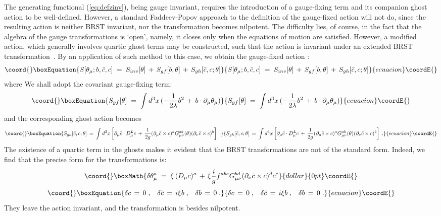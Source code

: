 \documentclass[a4paper,12pt]{article}
\begin{document}
The generating functional (\ref{eq:defzinv}), being gauge invariant,
requires the introduction of a gauge-fixing term and its companion
ghost action to be well-defined. However, a standard Faddeev-Popov
approach to the definition of the gauge-fixed action will not do,
since the resulting action is neither BRST invariant, nor the
transformation becomes nilpotent.  The difficulty lies, of course, in
the fact that the algebra of the gauge transformations is `open',
namely, it closes only when the equations of motion are satisfied.
However, a modified action, which generally involves quartic ghost
terms may be constructed, such that the action is invariant under an
extended BRST transformation~\cite{deWit:1978cd,teit}.  By an application
of such method to this case, we obtain the gauge-fixed action \coordHE{}:
\begin{equation}\coord{}\boxEquation{\label{eq:defsfx}
S[\theta_\mu;b,{\bar c}, c] \;=\; S_{inv}[\theta] \,+\,
S_{gf}[b,\theta]\,+\, S_{gh}[{\bar c},c;\theta] 
}{S[\theta_\mu;b,{\bar c}, c] \;=\; S_{inv}[\theta] \,+\,
S_{gf}[b,\theta]\,+\, S_{gh}[{\bar c},c;\theta] 
}{ecuacion}\coordE{}\end{equation}
where 
We shall adopt the covariant gauge-fixing term:
\begin{equation}\coord{}\boxEquation{\label{eq:defsgf}
S_{gf}[\theta] \;=\; \int d^3x \,( - \frac{1}{2\lambda} b^2
\,+\, b \cdot \partial_\mu \theta_\mu )  
}{S_{gf}[\theta] \;=\; \int d^3x \,( - \frac{1}{2\lambda} b^2
\,+\, b \cdot \partial_\mu \theta_\mu )  
}{ecuacion}\coordE{}\end{equation}
and the corresponding ghost action becomes
\begin{equation}\coord{}\boxEquation{\label{eq:defsgh}
S_{gh}[{\bar c},c;\theta]\,=\, \int d^3x \left[
\partial_\mu {\bar c} \cdot D_\mu^L c \,+\,
\frac{1}{2g} (\partial_\mu {\bar c} \times c)^a 
G_{\mu\nu}^{ab}(\theta)  (\partial_\nu{\bar c}\times c)^b \right]\;.
}{S_{gh}[{\bar c},c;\theta]\,=\, \int d^3x \left[
\partial_\mu {\bar c} \cdot D_\mu^L c \,+\,
\frac{1}{2g} (\partial_\mu {\bar c} \times c)^a 
G_{\mu\nu}^{ab}(\theta)  (\partial_\nu{\bar c}\times c)^b \right]\;.
}{ecuacion}\coordE{}\end{equation}
The existence of a quartic term in the ghosts makes it evident that the
BRST transformations are not of the standard form. Indeed, we find
that the precise form for the transformations is:
$$\coord{}\boxMath{
\delta \theta_\mu^a \;=\; \xi \, (D_\mu c)^a \,+\, \xi \frac{i}{g} f^{abe}
G_{\mu\nu}^{bd} (\partial_\nu {\bar c} \times c)^d c^e 
}{dollar}{0pt}\coordE{}$$
\begin{equation}\coord{}\boxEquation{\label{eq:defbrst}
\delta c \,=\, 0 \;,\;\;\;
\delta {\bar c} \,=\, i \xi b  \;,\;\;\; 
\delta b \,=\, 0 \;. 
}{\delta c \,=\, 0 \;,\;\;\;
\delta {\bar c} \,=\, i \xi b  \;,\;\;\; 
\delta b \,=\, 0 \;. 
}{ecuacion}\coordE{}\end{equation} 
They leave the action \coordHE{} invariant, and the transformation is besides 
nilpotent.
\end{document}

